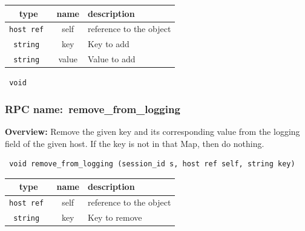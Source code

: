 
 
\vspace{0.3cm}
\begin{tabular}{|c|c|p{7cm}|}
 \hline
{\bf type} & {\bf name} & {\bf description} \\ \hline
{\tt host ref } & self & reference to the object \\ \hline 

{\tt string } & key & Key to add \\ \hline 

{\tt string } & value & Value to add \\ \hline 

\end{tabular}

\vspace{0.3cm}

{\tt 
void
}



\vspace{0.3cm}
\vspace{0.3cm}
\vspace{0.3cm}
\subsubsection{RPC name:~remove\_from\_logging}

{\bf Overview:} 
Remove the given key and its corresponding value from the logging field of
the given host.  If the key is not in that Map, then do nothing.

\begin{verbatim} void remove_from_logging (session_id s, host ref self, string key)\end{verbatim}



 
\vspace{0.3cm}
\begin{tabular}{|c|c|p{7cm}|}
 \hline
{\bf type} & {\bf name} & {\bf description} \\ \hline
{\tt host ref } & self & reference to the object \\ \hline 

{\tt string } & key & Key to remove \\ \hline 

\end{tabular}

\vspace{0.3cm}

